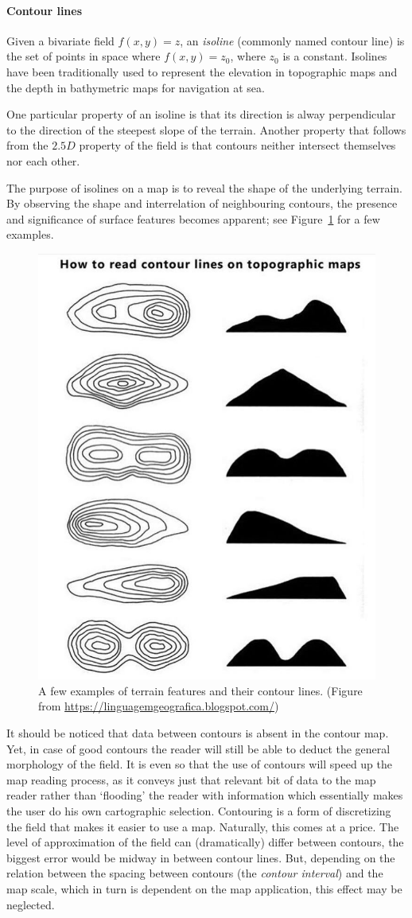%

\paragraph{Contour lines}

Given a bivariate field $f(x,y) = z$, an \emph{isoline} (commonly named contour line) is the set of points in space where $f(x,y) = z_0$, where $z_0$ is a constant. 
Isolines have been traditionally used to represent the elevation in topographic maps and the depth in bathymetric maps for navigation at sea. 

%

One particular property of an isoline is that its direction is alway perpendicular to the direction of the steepest slope of the terrain. 
Another property that follows from the $2.5D$ property of the field is that contours neither intersect themselves nor each other.

%

The purpose of isolines on a map is to reveal the shape of the underlying terrain. 
By observing the shape and interrelation of neighbouring contours, the presence and significance of surface features becomes apparent; see Figure~\ref{fig:contours} for a few examples.
\begin{figure}
  \centering
  \includegraphics[width=0.5\linewidth]{figs/contours.jpg}
  \caption{A few examples of terrain features and their contour lines. (Figure from \url{https://linguagemgeografica.blogspot.com/})}
\label{fig:contours}
\end{figure}
It should be noticed that data between contours is absent in the contour map. 
Yet, in case of good contours the reader will still be able to deduct the general morphology of the field. 
It is even so that the use of contours will speed up the map reading process, as it conveys just that relevant bit of data to the map reader rather than `flooding' the reader with information which essentially makes the user do his own cartographic selection. 
Contouring is a form of discretizing the field that makes it easier to use a map. 
Naturally, this comes at a price. 
The level of approximation of the field can (dramatically) differ between contours, the biggest error would be midway in between contour lines. 
But, depending on the relation between the spacing between contours (the \emph{contour interval}) and the map scale, which in turn is dependent on the map application, this effect may be neglected.



